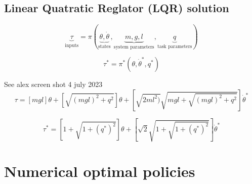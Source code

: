 \newpage
\subsection{Linear Quatratic Reglator (LQR) solution}


\begin{equation}
\underbrace{\tau}_{\text{inputs}}
=
\pi \left(
\underbrace{ \theta, \dot{\theta} }_{\text{states}},
\underbrace{ m , g , l }_{\text{system parameters}},
\underbrace{ q }_{\text{task parameters}}
\right)
\end{equation}

\begin{equation}
\tau^*
=
\pi^* \left(
 \theta, \dot{\theta}^* ,
 q^* 
\right)
\end{equation}


See alex screen shot 4 july 2023
\begin{equation}
\tau = 
\left[
mgl \right] \theta
+
\left[
\sqrt{ (mgl)^2 + q^2} \right] \theta
+
\left[
\sqrt{ 2 ml^2)} \sqrt{mgl+ \sqrt{ (mgl)^2 + q^2}}
\right] \dot{\theta}^*
\end{equation}

\begin{equation}
\tau^* = 
\left[
1 + \sqrt{ 1 + (q^*)^2}
\right] \theta
+
\left[
\sqrt{2} \sqrt{ 1 + \sqrt{ 1 + (q^*)^2}}
\right] \dot{\theta}^*
\end{equation}


\newpage
\section{Numerical optimal policies}

